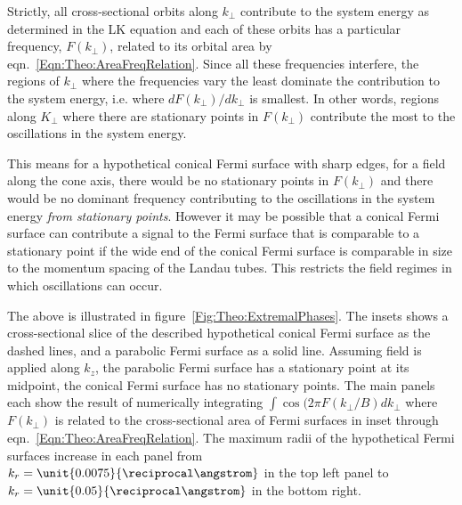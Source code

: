 Strictly, all cross-sectional orbits along $k_{\perp}$ contribute to the system energy as determined in the \ac{LK} equation and each of these orbits has a particular frequency, $F(k_{\perp})$, related to its orbital area by eqn.~\ref{Eqn:Theo:AreaFreqRelation}. Since all these frequencies interfere, the regions of $k_{\perp}$ where the frequencies vary the least dominate the contribution to the system energy, i.e. where $d F(k_{\perp})/dk_{\perp}$ is smallest. In other words, regions along $K_{\perp}$ where there are stationary points in $F(k_{\perp})$ contribute the most to the oscillations in the system energy.

This means for a hypothetical conical Fermi surface with sharp edges, for a field along the cone axis, there would be no stationary points in $F(k_{\perp})$ and there would be no dominant frequency contributing to the oscillations in the system energy \emph{from stationary points}. However it may be possible that a conical Fermi surface can contribute a signal to the Fermi surface that is comparable to a stationary point if the wide end of the conical Fermi surface is comparable in size to the momentum spacing of the Landau tubes. This restricts the field regimes in which oscillations can occur.

The above is illustrated in figure~\ref{Fig:Theo:ExtremalPhases}. The insets shows a cross-sectional slice of the described hypothetical conical Fermi surface as the dashed lines, and a parabolic Fermi surface as a solid line. Assuming field is applied along $k_z$, the parabolic Fermi surface has a stationary point at its midpoint, the conical Fermi surface has no stationary points. The main panels each show the result of numerically integrating $\int\cos{(2\pi F(k_{\perp}/B)} dk_{\perp}$ where $F(k_{\perp})$ is related to the cross-sectional area of Fermi surfaces in inset through eqn.~\ref{Eqn:Theo:AreaFreqRelation}. The maximum radii of the hypothetical Fermi surfaces increase in each panel from $k_r=\unit{0.0075}{\reciprocal\angstrom}$ in the top left panel to $k_r=\unit{0.05}{\reciprocal\angstrom}$ in the bottom right.

